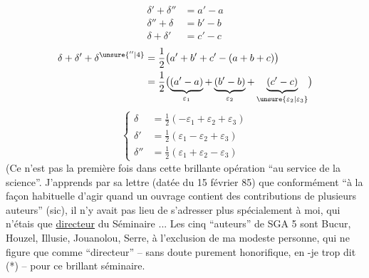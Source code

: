 \[\begin{aligned}
\delta'+\delta''&=a'-a\\
\delta''+\delta&=b'-b\\
\delta+\delta'&=c'-c
\end{aligned}\]
\[\begin{aligned}
\delta+\delta'+\delta^{\unsure{''|4}}
 &=\frac12\bigl(a'+b'+c'-(a+b+c)\bigr)\\
 &=\frac12\bigl(\underbrace{(a'-a)}_{\varepsilon_1}
 +\underbrace{(b'-b)}_{\varepsilon_2}+\underbrace{(c'-c)}_{\unsure{\varepsilon_2|\varepsilon_3}}\bigr)
\end{aligned}\]
\[\boxed{\left\{\begin{aligned}
\delta&=\frac12(-\varepsilon_1+\varepsilon_2+\varepsilon_3)\\
\delta'&=\frac12(\varepsilon_1-\varepsilon_2+\varepsilon_3)\\
\delta''&=\frac12(\varepsilon_1+\varepsilon_2-\varepsilon_3)
\end{aligned}\right.}\]
(Ce n'est pas la première fois dans cette brillante opération ``au service de la science''. J'apprends par sa lettre (datée du 15 février 85) que conformément  ``à la façon habituelle d'agir quand un ouvrage contient des contributions de plusieurs auteurs'' (sic), il n'y avait pas lieu de s'adresser plus spécialement à moi, qui n'étais que \uline{directeur} du Séminaire ... \deleted{(}Les cinq ``auteurs'' de SGA 5 sont Bucur, Houzel, Illusie, Jouanolou, Serre, à l'exclusion de ma modeste personne, qui  ne figure que comme ``directeur'' -- sans doute purement honorifique, en -je trop dit (*) -- pour ce brillant séminaire.

